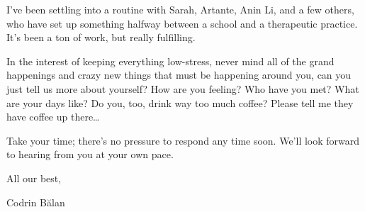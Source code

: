 I've been settling into a routine with Sarah, Artante, Anin Li, and a few others, who have set up something halfway between a school and a therapeutic practice. It's been a ton of work, but really fulfilling.

In the interest of keeping everything low-stress, never mind all of the grand happenings and crazy new things that must be happening around you, can you just tell us more about yourself? How are you feeling? Who have you met? What are your days like? Do you, too, drink way too much coffee? Please tell me they have coffee up there\ldots{}

Take your time; there's no pressure to respond any time soon. We'll look forward to hearing from you at your own pace.

All our best,

Codrin Bălan
